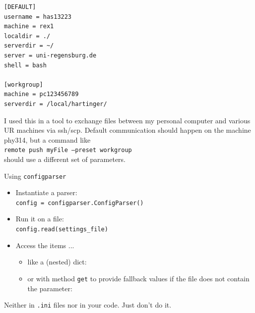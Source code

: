 \begin{frame}[fragile]
%
\begin{codebox}
\begin{verbatim}
[DEFAULT]
username = has13223
machine = rex1
localdir = ./
serverdir = ~/
server = uni-regensburg.de
shell = bash

[workgroup]
machine = pc123456789
serverdir = /local/hartinger/
\end{verbatim}
\end{codebox}
%
\begin{hintbox}[Context]
\footnotesize
I used this in a tool to exchange files between my personal computer and various UR machines via ssh/scp. Default communication should happen on the machine phy314, but a command like \\
\texttt{remote push myFile --preset workgroup} \\
should use a different set of parameters.
\end{hintbox}
%
\end{frame}


\begin{frame}{Using \texttt{configparser}}
%
\begin{itemize}
\item Instantiate a parser:\\
	\texttt{config = configparser.ConfigParser()}
\item Run it on a file:\\
	\texttt{config.read(settings\_file)}
\item Access the items ...
	\begin{itemize}
	\item like a (nested) dict: \\
	\item or with method \texttt{get} to provide fallback values if the file does not contain the parameter: \\
	\end{itemize}
\end{itemize}
%
\begin{warnbox}
\footnotesize
Neither in \texttt{.ini} files nor in your code. Just don't do it.
\end{warnbox}
%
\end{frame}

